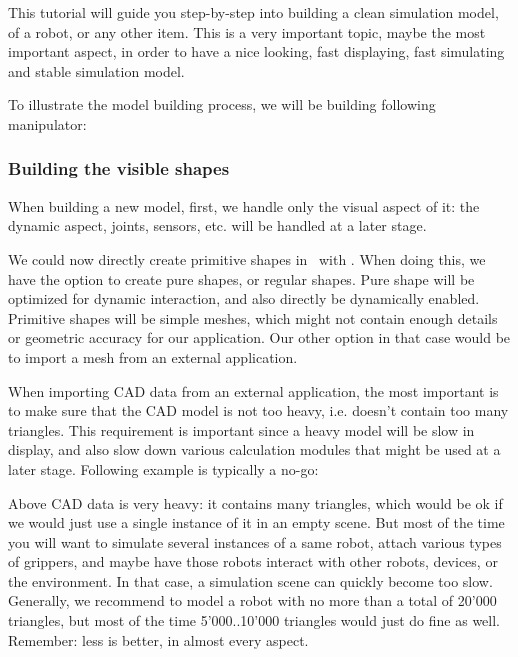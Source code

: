 \label{buildmodel}


This tutorial will guide you step-by-step into building a clean simulation 
model, of a robot, or any other item. This is a very important topic, maybe 
the most important aspect, in order to have a nice looking, fast displaying, 
fast simulating and stable simulation model.

To illustrate the model building process, we will be building following 
manipulator:


\subsubsection{Building the visible shapes}

When building a new model, first, we handle only the visual aspect of it: the 
dynamic aspect, joints, 
sensors, etc. will be handled at a later stage.

We could now directly create primitive shapes in \vrep\ with 
. When doing this, we have the option to
create pure shapes, or regular shapes. Pure shape will be optimized for 
dynamic interaction, and also directly be dynamically enabled. Primitive shapes will be 
simple meshes, which might not contain enough details or geometric accuracy 
for our application. Our other option in that case would be to import a mesh 
from an external application.

When importing CAD data from an external application, the most important is to 
make sure that the CAD model is not too heavy, i.e. doesn't contain too many 
triangles. This requirement is important since a heavy model will be slow in 
display, and also slow down various calculation modules that might be used at 
a later stage. Following 
example is typically a no-go:


Above CAD data is very heavy: it contains many triangles, which would be ok if we would just use a single instance of it in an 
empty scene. But most of the time you will want to simulate several instances 
of a same robot, attach various types of grippers, and maybe have those robots
interact with other robots, devices, or the environment. In that case, a 
simulation scene can quickly become too slow. Generally, we recommend to model 
a robot with no more than a total of 20'000 triangles, but most of the time 
5'000..10'000 triangles would just do fine as well. Remember: less is better,
in almost every aspect.

